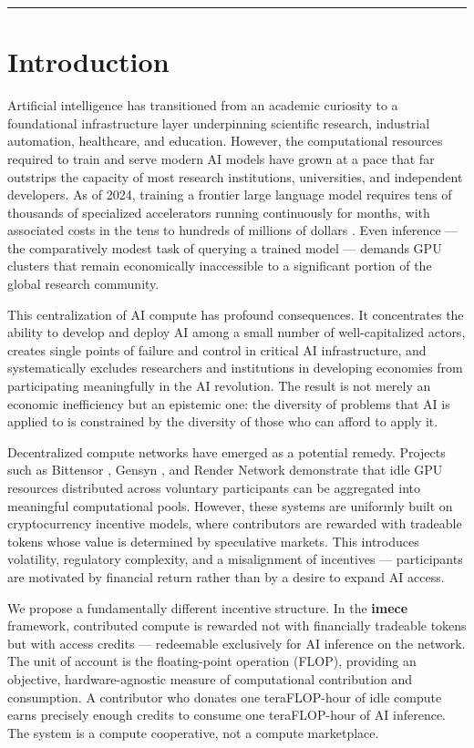 \documentclass[12pt]{article}
\begin{document}
\vspace{1em}
\hrule

\section{Introduction}

Artificial intelligence has transitioned from an academic curiosity to a foundational infrastructure layer underpinning scientific research, industrial automation, healthcare, and education. However, the computational resources required to train and serve modern AI models have grown at a pace that far outstrips the capacity of most research institutions, universities, and independent developers. As of 2024, training a frontier large language model requires tens of thousands of specialized accelerators running continuously for months, with associated costs in the tens to hundreds of millions of dollars \cite{openai2023gpt4}. Even inference — the comparatively modest task of querying a trained model — demands GPU clusters that remain economically inaccessible to a significant portion of the global research community.

This centralization of AI compute has profound consequences. It concentrates the ability to develop and deploy AI among a small number of well-capitalized actors, creates single points of failure and control in critical AI infrastructure, and systematically excludes researchers and institutions in developing economies from participating meaningfully in the AI revolution. The result is not merely an economic inefficiency but an epistemic one: the diversity of problems that AI is applied to is constrained by the diversity of those who can afford to apply it.

Decentralized compute networks have emerged as a potential remedy. Projects such as Bittensor \cite{bittensor2022}, Gensyn \cite{gensyn2022}, and Render Network \cite{rendernetwork2020} demonstrate that idle GPU resources distributed across voluntary participants can be aggregated into meaningful computational pools. However, these systems are uniformly built on cryptocurrency incentive models, where contributors are rewarded with tradeable tokens whose value is determined by speculative markets. This introduces volatility, regulatory complexity, and a misalignment of incentives — participants are motivated by financial return rather than by a desire to expand AI access.

We propose a fundamentally different incentive structure. In the \textbf{imece} framework, contributed compute is rewarded not with financially tradeable tokens but with access credits — redeemable exclusively for AI inference on the network. The unit of account is the floating-point operation (FLOP), providing an objective, hardware-agnostic measure of computational contribution and consumption. A contributor who donates one teraFLOP-hour of idle compute earns precisely enough credits to consume one teraFLOP-hour of AI inference. The system is a compute cooperative, not a compute marketplace.
\end{document}
